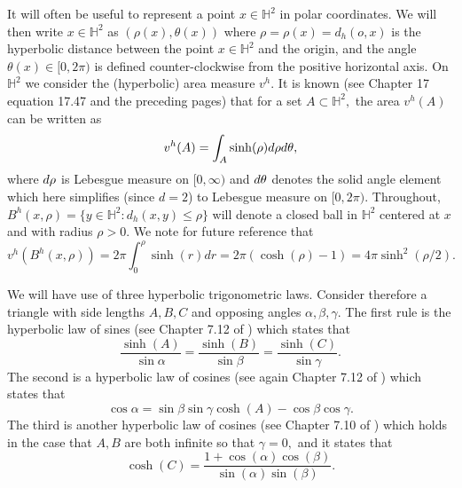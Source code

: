 \documentclass[10pt,a4paper]{amsart}
\newcommand{\BH}{{\mathbb{H}}}
\newcommand{\dd}{{\rm d}}
\begin{document}
It will often be useful to represent a point $x\in \BH^2$ in polar coordinates. 
We will then write $x\in \BH^2$ as $(\rho(x),\theta(x))$ where $\rho=\rho(x)=d_h(o,x)$ is 
the hyperbolic distance between the point $x\in \BH^2$ and the origin, 
and the angle $\theta(x)\in [0, 2 \pi)$ is defined 
counter-clockwise from the positive horizontal axis.
On $\BH^2$ we consider the (hyperbolic) area measure $v^h.$ It is known 
(see \cite{S_04}  Chapter 17 equation 17.47 and the preceding pages) that for a set $A\subset \BH^2,$ 
the area $v^h(A)$ can be written as
\begin{equation} \label{eqn:volumemeasureH}
   v^h(A)=\int_A \sinh(\rho) \dd\rho \dd\theta, 
\end{equation}
where $\dd \rho$ is Lebesgue measure on $[0,\infty)$ and $ \dd \theta$ denotes the solid angle element 
which here simplifies (since $d=2$) to Lebesgue measure on $[0,2\pi).$
Throughout, $B^h(x,\rho)=\{y\in \BH^2: d_h(x,y)\leq \rho\}$ will denote a closed 
 ball in 
$\BH^2$ centered at $x$ and with radius $\rho>0.$ We note for future reference that 
\begin{equation} \label{eqn:volhypball}
    v^h(B^h(x,\rho))=2 \pi \int_0^\rho \sinh(r)dr=2 \pi (\cosh(\rho)-1)
    =4\pi \sinh^2(\rho/2).
\end{equation}

We will have use of three hyperbolic trigonometric laws.  
Consider therefore a triangle
with side lengths $A,B,C$ and opposing angles $\alpha,\beta,\gamma.$ The first rule 
is the hyperbolic law of sines (see Chapter 7.12 
of \cite{B_93}) which states that 
\begin{equation} \label{eqn:hypsinerule}
\frac{\sinh(A)}{\sin \alpha}=\frac{\sinh(B)}{\sin \beta}=\frac{\sinh(C)}{\sin \gamma}.
\end{equation}
The second is a hyperbolic law of cosines (see again Chapter 7.12 
of \cite{B_93})
which states that 
\begin{equation} \label{eqn:hypcosinerule}
\cos \alpha= \sin \beta \sin \gamma \cosh(A)-\cos \beta \cos \gamma.   
\end{equation}
The third is another hyperbolic law of cosines (see Chapter 7.10 of \cite{B_93})
which holds in the case that $A,B$ are both infinite
so that $\gamma=0,$ and it states that
\begin{equation}\label{eqn:hypcosinerule_infinite}
\cosh(C)=\frac{1+\cos(\alpha)\cos(\beta)}{\sin(\alpha)\sin(\beta)}.    
\end{equation}
\end{document}
